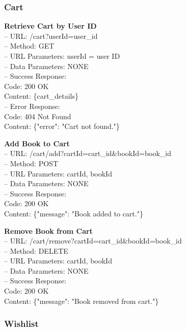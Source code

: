 \subsubsection*{Cart}

\textbf{Retrieve Cart by User ID} \\
– URL: /cart?userId={user\_id} \\
– Method: GET \\
– URL Parameters: userId = user ID \\
– Data Parameters: NONE \\
– Success Response: \\
Code: 200 OK \\
Content: \{cart\_details\} \\
– Error Response: \\
Code: 404 Not Found \\
Content: \{"error": "Cart not found."\}

\begin{flushleft} 
\textbf{Add Book to Cart} \\
– URL: /cart/add?cartId={cart\_id}\&bookId={book\_id} \\
– Method: POST \\
– URL Parameters: cartId, bookId \\
– Data Parameters: NONE \\
– Success Response: \\
Code: 200 OK \\
Content: \{"message": "Book added to cart."\}
\end{flushleft}

\begin{flushleft} 
\textbf{Remove Book from Cart} \\
– URL: /cart/remove?cartId={cart\_id}\&bookId={book\_id} \\
– Method: DELETE \\
– URL Parameters: cartId, bookId \\
– Data Parameters: NONE \\
– Success Response: \\
Code: 200 OK \\
Content: \{"message": "Book removed from cart."\}
\end{flushleft}

\subsubsection*{Wishlist}

